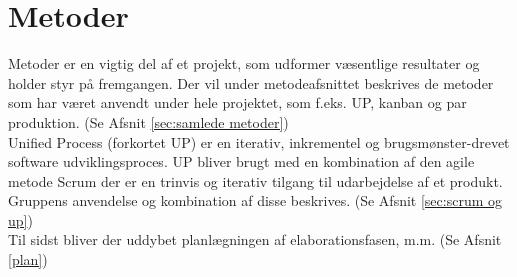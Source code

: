 \chapter{Metoder} \label{cap:metoder}
Metoder er en vigtig del af et projekt, som udformer væsentlige resultater og holder styr på fremgangen. Der vil under metodeafsnittet beskrives de metoder som har været anvendt under hele projektet, som f.eks. UP, kanban og par produktion. (Se Afsnit \ref{sec:samlede metoder}) \\
Unified Process (forkortet UP) er en iterativ, inkrementel og brugsmønster-drevet software udviklingsproces. UP bliver brugt med en kombination af den agile metode Scrum der er en trinvis og iterativ tilgang til udarbejdelse af et produkt. Gruppens anvendelse og kombination af disse beskrives. (Se Afsnit \ref{sec:scrum og up}) \\
Til sidst bliver der uddybet planlægningen af elaborationsfasen, m.m. (Se Afsnit \ref{plan})


